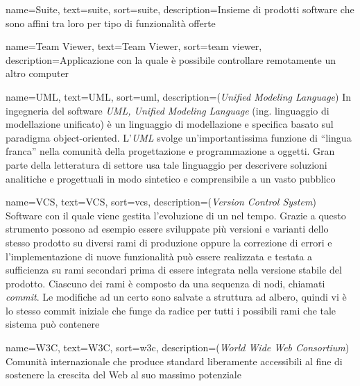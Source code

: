 {
    name={Suite},
    text=suite,
    sort=suite,
    description={Insieme di prodotti software che sono affini tra loro per tipo di funzionalità offerte}
}

{
    name={Team Viewer},
    text=Team Viewer,
    sort=team viewer,
    description={Applicazione con la quale è possibile controllare remotamente un altro computer}
}

{
    name={UML},
    text=UML,
    sort=uml,
    description={(\emph{Unified Modeling Language}) In ingegneria del software \emph{UML, Unified Modeling Language} (ing. linguaggio di modellazione unificato) è un linguaggio di modellazione e specifica basato sul paradigma object-oriented. L'\emph{UML} svolge un'importantissima funzione di ``lingua franca'' nella comunità della progettazione e programmazione a oggetti. Gran parte della letteratura di settore usa tale linguaggio per descrivere soluzioni analitiche e progettuali in modo sintetico e comprensibile a un vasto pubblico}
}

{
    name={VCS},
    text=VCS,
    sort=vcs,
    description={(\emph{Version Control System}) Software con il quale viene gestita l'evoluzione di un  nel tempo. Grazie a questo strumento possono ad esempio essere sviluppate più versioni e varianti dello stesso prodotto su diversi rami di produzione oppure la correzione di errori e l'implementazione di nuove funzionalità può essere realizzata e testata a sufficienza su rami secondari prima di essere integrata nella versione stabile del prodotto.
    Ciascuno dei rami è composto da una sequenza di nodi, chiamati \emph{commit}. Le modifiche ad un certo  sono salvate a struttura ad albero, quindi vi è lo stesso commit iniziale che funge da radice per tutti i possibili rami che tale sistema può contenere}
}

{
    name={W3C},
    text=W3C,
    sort=w3c,
    description={(\emph{World Wide Web Consortium}) Comunità internazionale che produce standard liberamente accessibili al fine di sostenere la crescita del Web al suo massimo potenziale}
}

